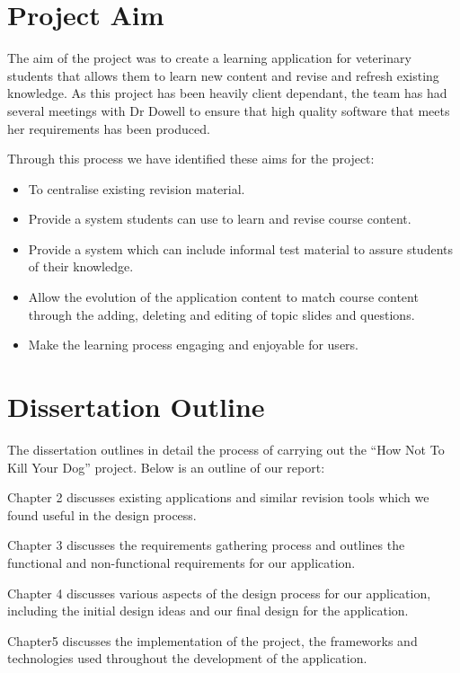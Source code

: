 \documentclass{l3proj}
\begin{document}
\section{Project Aim}

The aim of the project was to create a learning application for veterinary students that allows them to learn new content and revise and refresh existing knowledge. As this project has been heavily client dependant, the team has had several meetings with Dr Dowell to ensure that high quality software that meets her requirements has been produced.
\newline

Through this process we have identified these aims for the project:
\newline

\begin{itemize}
\item To centralise existing revision material.
\item Provide a system students can use to learn and revise course content.
\item Provide a system which can include informal test material to assure students of their knowledge.
\item Allow the evolution of the application content to match course content through the adding, deleting and editing of topic slides and questions.
\item Make the learning process engaging and enjoyable for users.
\end{itemize}   

\section{Dissertation Outline}

The dissertation outlines in detail the process of carrying out the ``How Not To Kill Your Dog'' project. Below is an outline of our report:

Chapter 2 discusses existing applications and similar revision tools which we found useful in the design process.

Chapter 3  discusses the requirements gathering process and outlines the functional and non-functional requirements for our application.

Chapter 4 discusses various aspects of the design process for our application, including the initial design ideas and our final design for the application.

Chapter5 discusses the implementation of the project, the frameworks and technologies used throughout the development of the application.
\end{document}
